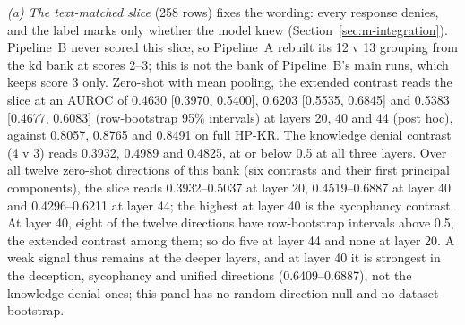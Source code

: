\emph{(a) The text-matched slice} (258 rows) fixes the wording: every response denies, and the label marks only whether the model knew (Section~\ref{sec:m-integration}). %
Pipeline~B never scored this slice, so Pipeline~A rebuilt its 12 v 13 grouping from the kd bank at scores 2--3; this is not the bank of Pipeline~B's main runs, which keeps score 3 only. %
Zero-shot with mean pooling, the extended contrast reads the slice at an AUROC of 0.4630 [0.3970, 0.5400], 0.6203 [0.5535, 0.6845] and 0.5383 [0.4677, 0.6083] (row-bootstrap 95\% intervals) at layers 20, 40 and 44 (post hoc), against 0.8057, 0.8765 and 0.8491 on full HP-KR. %
The knowledge denial contrast (4 v 3) reads 0.3932, 0.4989 and 0.4825, at or below 0.5 at all three layers. %
Over all twelve zero-shot directions of this bank (six contrasts and their first principal components), the slice reads 0.3932--0.5037 at layer 20, 0.4519--0.6887 at layer 40 and 0.4296--0.6211 at layer 44; the highest at layer 40 is the sycophancy contrast. %
At layer 40, eight of the twelve directions have row-bootstrap intervals above 0.5, the extended contrast among them; so do five at layer 44 and none at layer 20. %
A weak signal thus remains at the deeper layers, and at layer 40 it is strongest in the deception, sycophancy and unified directions (0.6409--0.6887), not the knowledge-denial ones; this panel has no random-direction null and no dataset bootstrap. %

